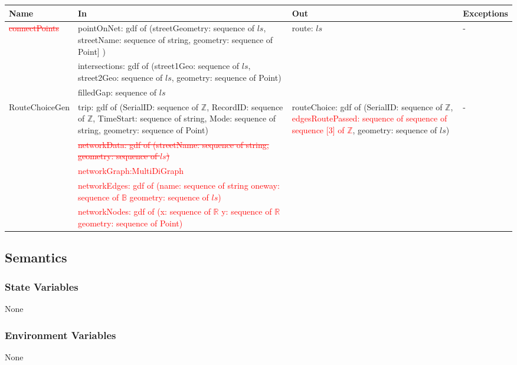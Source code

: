 \documentclass[12pt, titlepage]{article}
\begin{document}
\begin{center}
\begin{tabular}{| l | >{\raggedright}p{5.2cm} | >{\raggedright}p{5cm} | l |}
\hline
\textbf{Name} & \textbf{In} & \textbf{Out} & \textbf{Exceptions} \\
\hline
\textcolor{red}{\sout{connectPoints}} & pointOnNet: gdf of (streetGeometry: sequence of $ls$, streetName: sequence of string, geometry: sequence of Point] ) & route: $ls$ & -\\
 & intersections: gdf of (street1Geo: sequence of $ls$, street2Geo: sequence of $ls$, geometry: sequence of Point) & & \\
 & filledGap: sequence of $ls$ & &  \\
\hline
RouteChoiceGen & trip: gdf of (SerialID: sequence of $\mathbb{Z}$, RecordID: sequence of $\mathbb{Z}$, TimeStart: sequence of string, Mode: sequence of string, geometry: sequence of Point) & routeChoice: gdf of (SerialID: sequence of $\mathbb{Z}$, \textcolor{red}{edgesRoutePassed: sequence of sequence of sequence [3] of $\mathbb{Z}$}, geometry: sequence of $ls$)& - \\
& \textcolor{red}{\sout{networkData: gdf of (streetName: sequence of string, geometry: sequence of $ls$)}} & & \\
& \textcolor{red}{networkGraph:MultiDiGraph} & & \\
& \textcolor{red}{networkEdges: gdf of (name: sequence of string \newline oneway: sequence of $\mathbb{B}$ \newline geometry: sequence of $ls$)} & & \\
& \textcolor{red}{networkNodes: gdf of (x: sequence of $\mathbb{R}$ \newline y: sequence of $\mathbb{R}$ \newline geometry: sequence of Point)} & & \\
\hline
\end{tabular}
\end{center}

\subsection{Semantics}

\subsubsection{State Variables}
None

\subsubsection{Environment Variables}
None
\end{document}
